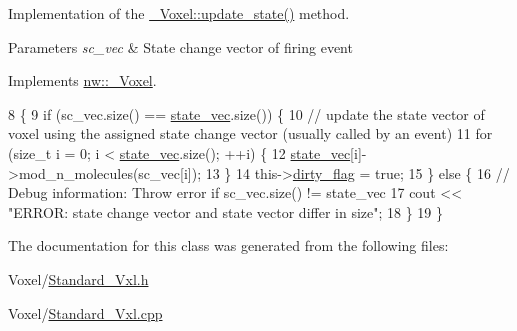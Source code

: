 Implementation of the \hyperlink{classnw_1_1___voxel_a5842ac3c24bda907204852db0cf46810}{\+\_\+\+Voxel\+::update\+\_\+state()} method. 


\begin{DoxyParams}{Parameters}
{\em sc\+\_\+vec} & State change vector of firing event \\
\hline
\end{DoxyParams}


Implements \hyperlink{classnw_1_1___voxel_a5842ac3c24bda907204852db0cf46810}{nw\+::\+\_\+\+Voxel}.


\begin{DoxyCode}
8 \{
9     \textcolor{keywordflow}{if} (sc\_vec.size() == \hyperlink{classnw_1_1___voxel_a7762f59802c2a0b54bd18acbf803ff34}{state\_vec}.size()) \{
10     \textcolor{comment}{//  update the state vector of voxel using the assigned state change vector (usually called by an
       event)}
11         \textcolor{keywordflow}{for} (\textcolor{keywordtype}{size\_t} i = 0; i < \hyperlink{classnw_1_1___voxel_a7762f59802c2a0b54bd18acbf803ff34}{state\_vec}.size(); ++i) \{
12             \hyperlink{classnw_1_1___voxel_a7762f59802c2a0b54bd18acbf803ff34}{state\_vec}[i]->mod\_n\_molecules(sc\_vec[i]);
13         \}
14         this->\hyperlink{classnw_1_1___voxel_a9c331fe7c0fd8691ef0124f33809764f}{dirty\_flag} = \textcolor{keyword}{true};
15     \} \textcolor{keywordflow}{else} \{
16     \textcolor{comment}{//  Debug information: Throw error if sc\_vec.size() != state\_vec}
17         cout << \textcolor{stringliteral}{"ERROR: state change vector and state vector differ in size"};
18     \}
19 \}
\end{DoxyCode}


The documentation for this class was generated from the following files\+:\begin{DoxyCompactItemize}
\item 
Voxel/\hyperlink{_standard___vxl_8h}{Standard\+\_\+\+Vxl.\+h}\item 
Voxel/\hyperlink{_standard___vxl_8cpp}{Standard\+\_\+\+Vxl.\+cpp}\end{DoxyCompactItemize}
